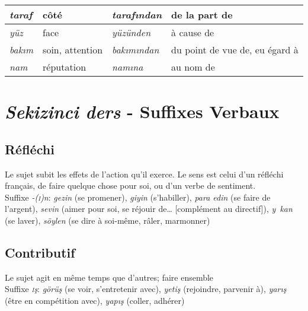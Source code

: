 \documentclass{cours}
\newcommand{\ch}{\c{s}}
\newcommand{\sci}{\textsc{i}}
\begin{document}
\begin{enumerate}
\begin{center}
\begin{tabular}{>{\sl}ll|>{\sl}ll}
                  \midrule
                  taraf   & côté            & taraf\i ndan   & de la part de                  \\
                  \midrule
                  yüz     & face            & yüzünden       & à cause de                     \\
                  \midrule
                  bak\i m & soin, attention & bak\i m\i ndan & du point de vue de, eu égard à \\
                  \midrule
                  nam     & réputation      & nam\i na       & au nom de                      \\
                  \bottomrule
              \end{tabular}
          \end{center}

\end{enumerate}

\section{\textsl{Sekizinci ders} - Suffixes Verbaux}
\subsection{Réfléchi}
Le sujet subit les effets de l'action qu'il exerce. Le sens est celui d'un réfléchi français, de \og faire quelque chose pour soi\fg, ou d'un verbe de sentiment.\\
Suffixe {\sl -(\sci)n}: {\sl gezin} (se promener), {\sl giyin} (s'habiller), {\sl para edin} (se faire de l'argent), {\sl sevin} (aimer pour soi, se réjouir de… [complément au directif]), {\sl y\ kan} (se laver), {\sl söylen} (se dire à soi-même, râler, marmonner)
\subsection{Contributif}
Le sujet agit en même temps que d'autres; \og faire ensemble\fg\\
Suffixe \textsl{\sci\ch}: \textsl{görü\ch} (se voir, s'entretenir avec), \textsl{yeti\ch} (rejoindre, parvenir à), \textsl{yar\i\ch} (être en compétition avec), \textsl{yap\i\ch} (coller, adhérer)
\end{document}
